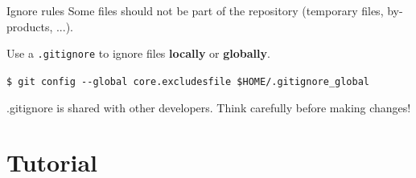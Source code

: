 \documentclass[compress,english,aspectratio=1610]{beamer}
\begin{document}
\begin{frame}{Ignore rules}
	Some files should not be part of the repository (temporary files, by-products, ...).

	Use a {\tt .gitignore} to ignore files \textbf{locally} or \textbf{globally}.
	\begin{tcolorbox}[colback=mpg-gray,colframe=mpg-green,title=Global .gitignore]
		{\tt \$ git config -{}-global core.excludesfile   \$HOME/.gitignore\_global}
	\end{tcolorbox}
	\begin{tcolorbox}[colback=mpg-gray,colframe=red!40!black,title=Warning]
		.gitignore is shared with other developers. Think carefully before making changes!
	\end{tcolorbox}
\end{frame}


\section{Tutorial}
\end{document}
